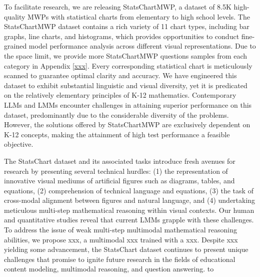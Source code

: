 To facilitate research, we are releasing StatsChartMWP, a dataset of 8.5K high-quality MWPs with statistical charts from elementary to high school levels. The StatsChartMWP dataset contains a rich variety of 11 chart types, including bar graphs, line charts, and histograms, which provides opportunities to conduct fine-grained model performance analysis across different visual representations. Due to the space limit, we provide more StatsChartMWP questions samples from each category in Appendix \ref{xxx}. Every corresponding statistical chart is meticulously scanned to guarantee optimal clarity and accuracy. We have engineered this dataset to exhibit substantial linguistic and visual diversity, yet it is predicated on the relatively elementary principles of K-12 mathematics. Contemporary LLMs and LMMs encounter challenges in attaining superior performance on this dataset, predominantly due to the considerable diversity of the problems. However, the solutions offered by StatsChartMWP are exclusively dependent on K-12 concepts, making the attainment of high test performance a feasible objective.








The StatsChart dataset and its associated tasks introduce fresh avenues for research by presenting several technical hurdles: (1) the representation of innovative visual mediums of artificial figures such as diagrams, tables, and equations, (2) comprehension of technical language and equations, (3) the task of cross-modal alignment between figures and natural language, and (4) undertaking meticulous multi-step mathematical reasoning within visual contexts. Our human and quantitative studies reveal that current LMMs grapple with these challenges. To address the issue of weak multi-step multimodal mathematical reasoning abilities, we propose xxx, a multimodal xxx trained with a xxx. Despite xxx yielding some advancement, the StatsChart dataset continues to present unique challenges that promise to ignite future research in the fields of educational content modeling, multimodal reasoning, and question answering. to





